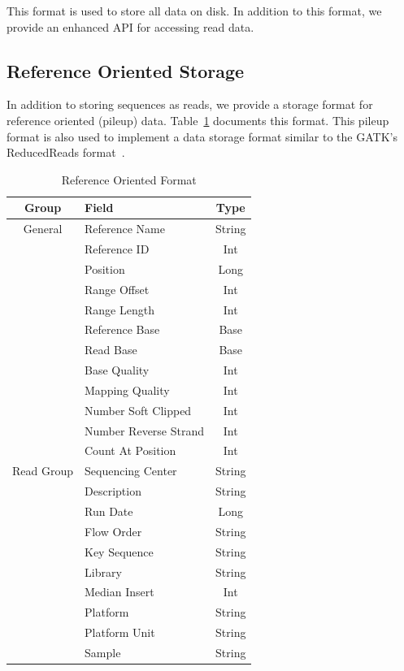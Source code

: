 \documentclass[10pt,twocolumn]{article}
\theoremstyle{plain}
\begin{document}
This format is used to store all data on disk. In addition to this format, we provide an enhanced API for accessing read
data.

\subsection{Reference Oriented Storage}
\label{sec:reference-oriented-storage}

In addition to storing sequences as reads, we provide a storage format for reference oriented (pileup) data. Table~\ref{tab:reference-oriented-format} documents this format. This pileup format is also used to implement a data storage
format similar to the GATK's ReducedReads format~\cite{depristo11}.

\begin{table}[h]
\caption{Reference Oriented Format}
\label{tab:reference-oriented-format}
\begin{center}
\begin{tabular}{| c | l | c |}
\hline
\bf Group & \bf Field & \bf Type \\
\hline
General & Reference Name & String \\
 & Reference ID & Int \\
 & Position & Long \\
 & Range Offset & Int \\
 & Range Length & Int \\
 & Reference Base & Base \\
 & Read Base & Base \\
 & Base Quality & Int \\
 & Mapping Quality & Int \\
 & Number Soft Clipped & Int \\
 & Number Reverse Strand & Int \\
 & Count At Position & Int \\
\hline
Read Group & Sequencing Center & String \\
 & Description & String \\
 & Run Date & Long \\
 & Flow Order & String \\
 & Key Sequence & String \\
 & Library & String \\
 & Median Insert & Int \\
 & Platform & String \\
 & Platform Unit & String \\
 & Sample & String \\
\hline
\end{tabular}
\end{center}
\end{table}
\end{document}

